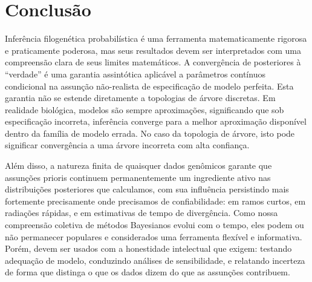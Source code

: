 \section{Conclusão}

Inferência filogenética probabilística é uma ferramenta matematicamente rigorosa e praticamente poderosa, mas seus resultados devem ser interpretados com uma compreensão clara de seus limites matemáticos. A convergência de posteriores à ``verdade'' é uma garantia assintótica aplicável a parâmetros contínuos condicional na assunção não-realista de especificação de modelo perfeita. Esta garantia não se estende diretamente a topologias de árvore discretas. Em realidade biológica, modelos são sempre aproximações, significando que sob especificação incorreta, inferência converge para a melhor aproximação disponível dentro da família de modelo errada. No caso da topologia de árvore, isto pode significar convergência a uma árvore incorreta com alta confiança.

Além disso, a natureza finita de quaisquer dados genômicos garante que assunções prioris continuem permanentemente um ingrediente ativo nas distribuições posteriores que calculamos, com sua influência persistindo mais fortemente precisamente onde precisamos de confiabilidade: em ramos curtos, em radiações rápidas, e em estimativas de tempo de divergência. Como nossa compreensão coletiva de métodos Bayesianos evolui com o tempo, eles podem ou não permanecer populares e considerados uma ferramenta flexível e informativa. Porém, devem ser usados com a honestidade intelectual que exigem: testando adequação de modelo, conduzindo análises de sensibilidade, e relatando incerteza de forma que distinga o que os dados dizem do que as assunções contribuem.

